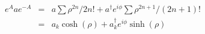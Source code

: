 \begin{equation}
  \begin{array}{lll}
    e^{A}a e^{-A}
    &=& a \sum\rho^{2n}/2n! + a^\dagger e^{i\phi}\sum \rho^{2n+1}/(2n+1)!\\
    &=&  a_k \cosh (\rho) +  a_k^\dagger e^{i\phi}\sinh (\rho)
  \end{array}
\end{equation}

